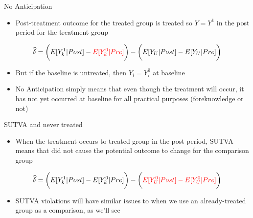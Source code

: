 \documentclass{beamer}
\begin{document}
\begin{frame}{No Anticipation}

\begin{itemize}
\item Post-treatment outcome for the treated group is treated so $Y=Y^1$ in the post period for the treatment group
\end{itemize}

\begin{eqnarray*}
\widehat{\delta} = \bigg ( E[Y^1_k|Post] - \textcolor{red}{E[Y^0_k|Pre]} \bigg ) - \bigg ( E[Y_U | Post ] - E[ Y_U | Pre] \bigg) \\
\end{eqnarray*}

\begin{itemize}
\item But if the baseline is untreated, then $Y_i=Y^0_i$ at baseline
\item No Anticipation simply means that even though the treatment will occur, it has not yet occurred at baseline for all practical purposes (foreknowledge or not)
\end{itemize}


\end{frame}





\begin{frame}{SUTVA and never treated}

\begin{itemize}
\item When the treatment occurs to treated group in the post period, SUTVA means that did not cause the potential outcome to change for the comparison group
\end{itemize}

\begin{eqnarray*}
\widehat{\delta} = \bigg ( E[Y^1_k|Post] - \textcolor{black}{E[Y^0_k|Pre]} \bigg ) - \bigg ( \textcolor{red}{E[Y^0_U | Post ] - E[ Y^0_U | Pre] }\bigg) \\
\end{eqnarray*}

\begin{itemize}
\item SUTVA violations will have similar issues to when we use an already-treated group as a comparison, as we'll see
\end{itemize}


\end{frame}
\end{document}
